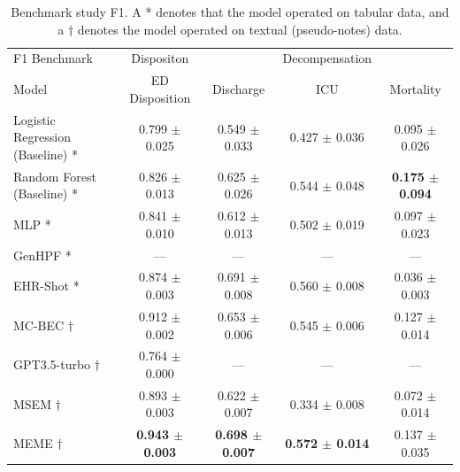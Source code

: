 \documentclass{article}
\theoremstyle{plain}
\theoremstyle{definition}
\theoremstyle{remark}
\begin{document}
\begin{table}[H]
\caption{Benchmark study F1. A * denotes that the model operated on tabular data, and a $\dagger$ denotes the model operated on textual (pseudo-notes) data.}
\label{r1}
\begin{adjustbox}{width=\columnwidth}
\begin{small}
\begin{tabular}{l|c|ccc}
\toprule
F1 Benchmark & Dispositon & & Decompensation &\\
Model & ED Disposition & Discharge & ICU & Mortality \\
\midrule
Logistic Regression (Baseline) * &0.799 $\pm$ 0.025&0.549 $\pm$ 0.033& 0.427 $\pm$ 0.036& 0.095 $\pm$ 0.026\\
Random Forest (Baseline) * & 0.826 $\pm$ 0.013 & 0.625 $\pm$ 0.026 & 0.544 $\pm$ 0.048 &  \textbf{0.175 $\pm$ 0.094}  \\
MLP * & 0.841 $\pm$ 0.010 & 0.612 $\pm$ 0.013 & 0.502 $\pm$ 0.019 & 0.097 $\pm$ 0.023 \\
GenHPF \citep{hur2023genhpf} * & --- & --- & ---& --- \\
EHR-Shot\citep{wornow2024ehrshot} *& 0.874 $\pm$ 0.003 & 0.691 $\pm$ 0.008 & 0.560 $\pm$ 0.008 & 0.036 $\pm$ 0.003 \\
MC-BEC\citep{chen2023multimodal} $\dagger$ & 0.912 $\pm$ 0.002& 0.653 $\pm$ 0.006 & 0.545 $\pm$ 0.006 & 0.127 $\pm$ 0.014\\
GPT3.5-turbo $\dagger$ & 0.764 $\pm$ 0.000& --- & --- & ---\\
MSEM $\dagger$& 0.893 $\pm$ 0.003 & 0.622 $\pm$ 0.007 & 0.334 $\pm$ 0.008 & 0.072 $\pm$ 0.014\\
MEME $\dagger$& \textbf{0.943 $\pm$ 0.003} & \textbf{0.698 $\pm$ 0.007} & \textbf{0.572 $\pm$ 0.014} & 0.137 $\pm$ 0.035 \\
\bottomrule
\end{tabular}
\end{small}
\end{adjustbox}
\end{table}
\vspace{-0.6cm}
\end{document}
